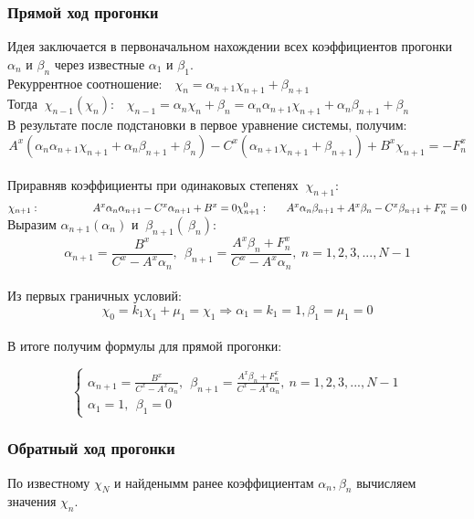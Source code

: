 \documentclass[a4paper]{article}
\begin{document}
\subsubsection{Прямой ход прогонки}
Идея заключается в первоначальном нахождении всех коэффициентов прогонки $\alpha _n$ и $\beta _n$ через известные $\alpha _1$ и $\beta _1$.\\
Рекуррентное соотношение: $~~~\chi_n = \alpha _{n+1}\chi_{n+1}+\beta _{n+1}$\\
Тогда $~\chi_{n-1}(\chi_n)$:
$~~~\chi_{n-1}=\alpha _n \chi_n + \beta _n= \alpha _n \alpha _{n+1} \chi_{n+1} +\alpha _n \beta _{n+1} + \beta _n$\\
В результате после подстановки в первое уравнение системы, получим:
$$
A^x\left(\alpha _n \alpha _{n+1}\chi_{n+1} +\alpha _n \beta _{n+1} + \beta _n\right) - C^x\left(\alpha _{n+1} \chi_{n+1} +\beta _{n+1}\right) +B^x\chi_{n+1} = -F^x_n
$$\\
Приравняв коэффициенты при одинаковых степенях $~\chi_{n+1}$:\\
$
\chi_{n+1}:~~~~~~~~~~~~~~~A^x\alpha _n \alpha _{n+1} - C^x\alpha _{n+1} + B^x =0\\
\chi^0_{n+1}:~~~~~A^x\alpha _n \beta _{n+1} +A^x\beta _n- C^x\beta _{n+1} + F^x_n =0
$\\
Выразим $\alpha _{n+1}(\alpha _n)$ и $~\beta _{n+1}(~\beta _n)$:
$$
\alpha _{n+1}=\frac{B^x}{C^x-A^x\alpha _n},~~\beta _{n+1} = \frac{A^x\beta _n+F^x_n}{C^x-A^x\alpha _n}, ~n=1,2,3,...,N-1
$$\\
Из первых граничных условий:
$$
\chi_0=k_1\chi_1+\mu _1=\chi_1 \Rightarrow \alpha _1 =k_1=1, \beta _1=\mu _1=0
$$\\
В итоге получим формулы для прямой прогонки:

\begin{equation}
\left\{\begin{array}{l}
\alpha _{n+1}=\frac{B^x}{C^x-A^x\alpha _n},~~\beta _{n+1} = \frac{A^x\beta _n+F^x_n}{C^x-A^x\alpha _n}, ~n=1,2,3,...,N-1
\\\alpha_1=1,~~\beta_1=0
\end{array}\right.
\end{equation}

\subsubsection{Обратный ход прогонки}
По известному $\chi_N$ и найденымм ранее коэффициентам $\alpha _n$,$~\beta _n$ вычисляем значения $\chi_n$.
\end{document}
